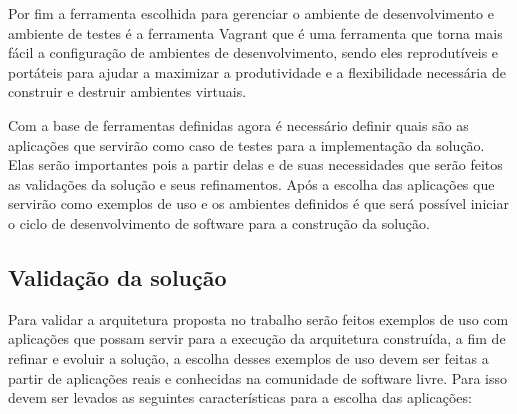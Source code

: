 Por fim a ferramenta escolhida para gerenciar o ambiente de desenvolvimento e
ambiente de testes é a ferramenta Vagrant que é uma ferramenta que torna mais fácil
a configuração de ambientes de desenvolvimento, sendo eles reprodutíveis e
portáteis para ajudar a maximizar a produtividade e a flexibilidade necessária
de construir e destruir ambientes virtuais.\cite{vagrant}

Com a base de ferramentas definidas agora é necessário definir quais são as
aplicações que servirão como caso de testes para a implementação da solução. Elas
serão importantes pois a partir delas e de suas necessidades que serão feitos as
validações da solução e seus refinamentos. Após a escolha das aplicações que
servirão como exemplos de uso e os ambientes definidos é que será possível
iniciar o ciclo de desenvolvimento de software para a construção da solução.

\subsection{Validação da solução}
\label{subsection:validacao}

Para validar a arquitetura proposta no trabalho serão feitos exemplos de uso
com aplicações que possam servir para a execução da arquitetura construída, a
fim de refinar e evoluir a solução, a escolha desses exemplos de uso devem ser
feitas a partir de aplicações reais e conhecidas na comunidade de software livre.
 Para isso devem ser levados as seguintes características para a escolha das aplicações:

